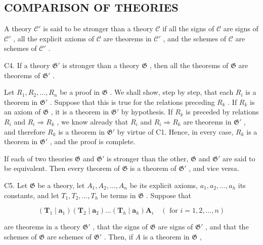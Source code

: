 \subsection{COMPARISON OF THEORIES}

A theory \(\mathcal{C}'\) is said to be stronger than a theory \(\mathcal{C}\) if all the signs of \(\mathcal{C}\) are signs of \(\mathcal{C}'\) , all the explicit axioms of \(\mathcal{C}\) are theorems in \(\mathcal{C}'\) , and the schemes of \(\mathcal{C}\) are schemes of \(\mathcal{C}'\) .

C4. If a theory \(\mathfrak{G}'\) is stronger than a theory \(\mathfrak{G}\) , then all the theorems of \(\mathfrak{G}\) are theorems of \(\mathfrak{G}'\) .

Let \(R_1, R_2, \ldots, R_n\) be a proof in \(\mathfrak{G}\) . We shall show, step by step, that each \(R_i\) is a theorem in \(\mathfrak{G}'\) . Suppose that this is true for the relations preceding \(R_k\) . If \(R_k\) is an axiom of \(\mathfrak{G}\) , it is a theorem in \(\mathfrak{G}'\) by hypothesis. If \(R_k\) is preceded by relations \(R_i\) and \(R_i \Longrightarrow R_k\) , we know already that \(R_i\) and \(R_i \Longrightarrow R_k\) are theorems in \(\mathfrak{G}'\) , and therefore \(R_k\) is a theorem in \(\mathfrak{G}'\) by virtue of C1. Hence, in every case, \(R_k\) is a theorem in \(\mathfrak{G}'\) , and the proof is complete.

If each of two theories \(\mathfrak{G}\) and \(\mathfrak{G}'\) is stronger than the other, \(\mathfrak{G}\) and \(\mathfrak{G}'\) are said to be equivalent. Then every theorem of \(\mathfrak{G}\) is a theorem of \(\mathfrak{G}'\) , and vice versa.

C5. Let \(\mathfrak{G}\) be a theory, let \(A_{1}, A_{2}, \ldots, A_{n}\) be its explicit axioms, \(a_{1}, a_{2}, \ldots, a_{h}\) its constants, and let \(T_{1}, T_{2}, \ldots, T_{h}\) be terms in \(\mathfrak{G}\) . Suppose that

\[
\left(\boldsymbol {T} _ {1} \mid \boldsymbol {a} _ {1}\right) \left(\boldsymbol {T} _ {2} \mid \boldsymbol {a} _ {2}\right) \dots \left(\boldsymbol {T} _ {h} \mid \boldsymbol {a} _ {h}\right) \boldsymbol {A} _ {i} \quad (\text { for } i = 1, 2, \dots , n)
\]

are theorems in a theory \(\mathfrak{G}'\) , that the signs of \(\mathfrak{G}\) are signs of \(\mathfrak{G}'\) , and that the schemes of \(\mathfrak{G}\) are schemes of \(\mathfrak{G}'\) . Then, if \(A\) is a theorem in \(\mathfrak{G}\) ,

